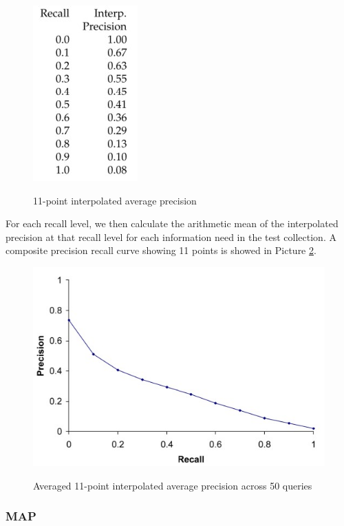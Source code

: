 \begin{figure}[h!]
		\centering
		\includegraphics[scale = 1.6]{img/interpolated precision.jpg}
		\label{interpolated}
        \caption{11-point interpolated average precision}
\end{figure}

For each recall level, we then calculate the arithmetic mean of the interpolated precision at that recall level for each information need in the test collection. A composite precision recall curve showing 11 points is showed in Picture \ref{interpolated2}.

\begin{figure}[h!]
		\centering
		\includegraphics[scale = 1.8]{img/interpolated precision 2.jpg}
		\label{interpolated2}
        \caption{Averaged 11-point interpolated average precision across 50 queries}
\end{figure}

\subsubsection{MAP}

